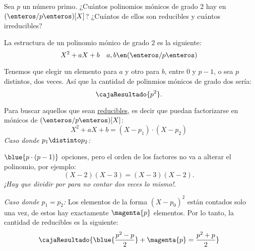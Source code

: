 \begin{enunciado}{\ejercicio}
  Sea $p$ un número primo. ¿Cuántos polinomios mónicos de grado 2 hay en $(\enteros/p\enteros)[X]$? ¿Cuántos de ellos
  son reducibles y cuántos irreducibles?
\end{enunciado}

La estructura de un polinomio mónico de grado $2$ es la siguiente:
$$
  X^2 + aX + b \quad a, b \en (\enteros/p\enteros)
$$

Tenemos que elegir un elemento para $a$ y otro para $b$, entre $0$ y $p-1$, o sea
$p$ distintos, dos veces.
Así que la cantidad de polinmios mónicos de grado dos sería:
$$
  \cajaResultado{p^2}.
$$

Para buscar aquellos que sean \ul{reducibles}, es decir que puedan factorizarse en mónicos de $(\enteros/p\enteros)[X]$:
$$
  X^2 + aX + b
  =
  (X - p_1) \cdot (X - p_2)
$$
\textit{Caso donde $p_1 \distinto p_2$:}

$\blue{p \cdot (p - 1)}$ opciones, pero el orden de los factores no va a alterar el polinomio,
por ejemplo:
$$
  (X - 2)(X - 3) = (X - 3)(X - 2).
$$
\textit{¡Hay que dividir por  para no contar dos veces lo mismo!}.

\textit{Caso donde $p_1 = p_2$:}
Los elementos de la forma $(X - p_0)^2$ están contados solo una vez,
de estos hay exactamente $\magenta{p}$ elementos. Por lo tanto, la cantidad de reducibles es la siguiente:
$$
  \cajaResultado{\blue{\frac{p^2 - p}{2}} + \magenta{p} = \frac{p^2 + p}{2}}
$$

\begin{aportes}
  \item {}
  \item {}
\end{aportes}
